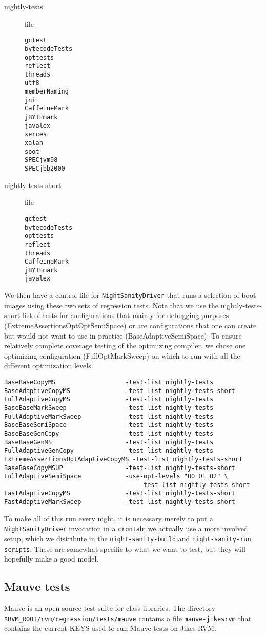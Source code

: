 \begin{description}
\item[nightly-tests] file
\begin{verbatim}
gctest
bytecodeTests
opttests
reflect
threads
utf8
memberNaming
jni
CaffeineMark
jBYTEmark
javalex 
xerces
xalan
soot
SPECjvm98 
SPECjbb2000 
\end{verbatim}
\item[nightly-tests-short] file
\begin{verbatim}
gctest
bytecodeTests
opttests
reflect
threads
CaffeineMark
jBYTEmark
javalex 
\end{verbatim}
\end{description}

 We then have a control file for {\tt{NightSanityDriver}} that runs a
selection of boot images using these two sets of regression tests.
Note that we use the nightly-tests-short list of tests for
configurations that mainly for debugging purposes
(ExtremeAssertionsOptOptSemiSpace) or are configurations that one can
create but would not want to use in practice (BaseAdaptiveSemiSpace).
To ensure relatively complete coverage testing of the optimizing
compiler, we chose one optimizing configuration (FullOptMarkSweep) on
which to run with all the different optimization levels.

\begin{verbatim}
BaseBaseCopyMS                   -test-list nightly-tests
BaseAdaptiveCopyMS               -test-list nightly-tests-short
FullAdaptiveCopyMS               -test-list nightly-tests
BaseBaseMarkSweep                -test-list nightly-tests
FullAdaptiveMarkSweep            -test-list nightly-tests
BaseBaseSemiSpace                -test-list nightly-tests
BaseBaseGenCopy                  -test-list nightly-tests
BaseBaseGenMS                    -test-list nightly-tests
FullAdaptiveGenCopy              -test-list nightly-tests
ExtremeAssertionsOptAdaptiveCopyMS -test-list nightly-tests-short
BaseBaseCopyMSUP                 -test-list nightly-tests-short
FullAdaptiveSemiSpace            -use-opt-levels "O0 O1 O2" \
                                     -test-list nightly-tests-short
FastAdaptiveCopyMS               -test-list nightly-tests-short
FastAdaptiveMarkSweep            -test-list nightly-tests-short
\end{verbatim}

 To make all of this run every night, it is necessary merely to put a
{\tt Night\-San\-i\-ty\-Dri\-ver} invocation in a {\tt crontab}; we actually use a more
involved setup, which we distribute in the {\tt night-sanity-build} and
{\tt night-sanity-run scripts}.  These are somewhat specific to what we want
to test, but they will hopefully make a good model.

\subsection{Mauve tests}
Mauve is an open source test suite for class libraries.  The directory 
{\tt{\$RVM\_\-ROOT/\-rvm/\-re\-gres\-sion/\-tests/\-mauve}} contains a file
{\tt mauve-jikesrvm} that contains the current KEYS used to run Mauve tests
on Jikes RVM. 

